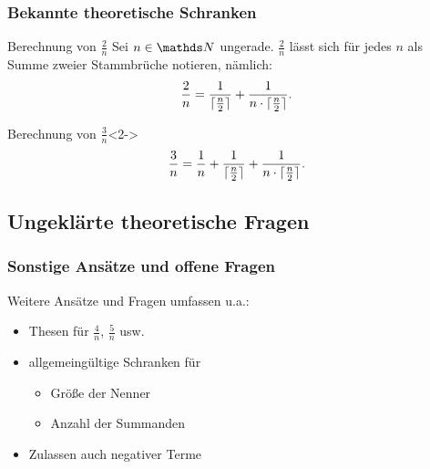 \documentclass{beamer}
\begin{document}
\begin{frame}
	\frametitle{Bekannte theoretische Schranken}
	\begin{block}{Berechnung von $\frac{2}{n}$}
	Sei $n \in \N$ ungerade. $\frac{2}{n}$ lässt sich für jedes $n$ als Summe zweier Stammbrüche notieren, nämlich:
	$$\frac{2}{n} = \frac{1}{\lceil \frac{n}{2} \rceil} + \frac{1}{n \cdot \lceil \frac{n}{2} \rceil}.$$
	\end{block}
	\begin{block}{Berechnung von $\frac{3}{n}$}<2->
		$$\frac{3}{n} = \frac{1}{n} + \frac{1}{\lceil \frac{n}{2} \rceil} + \frac{1}{n \cdot \lceil \frac{n}{2} \rceil}.$$
	\end{block}
\end{frame}

\subsection{Ungeklärte theoretische Fragen}

\begin{frame}
	\frametitle{Sonstige Ansätze und offene Fragen}
	Weitere Ansätze und Fragen umfassen u.a.:
	\begin{itemize}
		\item Thesen für $\frac{4}{n}$, $\frac{5}{n}$ usw.
		\item allgemeingültige Schranken für
		\begin{itemize}
			\item Größe der Nenner
			\item Anzahl der Summanden
		\end{itemize}
		\item Zulassen auch negativer Terme
	\end{itemize}
\end{frame}
\end{document}

